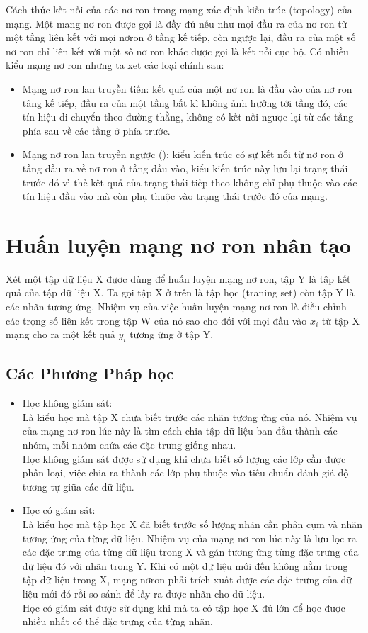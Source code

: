 \documentclass[13pt, a4paper]{extreport}
\begin{document}
\indent Cách thức kết nối của các nơ ron trong mạng xác định kiến trúc (topology) của mạng. Một mang nơ ron được gọi là đầy đủ nếu như mọi đầu ra của nơ ron từ một tầng liên kết với mọi nơron ở tầng kế tiếp, còn ngược lại, đầu ra của một số nơ ron chỉ liên kết với một sô nơ ron khác được gọi là kết nỗi cục bộ. Có nhiều kiểu mạng nơ ron nhưng ta xet các loại chính sau:
\begin{itemize}
\item Mạng nơ ron lan truyền tiến: kết quả của một nơ ron là đầu vào của nơ ron tâng kế tiếp, đầu ra của một tầng bất kì không ảnh hưởng tới tầng đó, các tín hiệu di chuyển theo đường thằng, không có kết nối ngược lại từ các tầng phía sau về các tầng ở phía trước.
\item Mạng nơ ron lan truyền ngược (): kiểu kiến trúc có sự kết nối từ nơ ron ở tầng đầu ra về nơ ron ở tầng đầu vào, kiểu kiến trúc này lưu lại trạng thái trước đó vì thế kêt quả của trạng thái tiếp theo không chỉ phụ thuộc vào các tín hiệu đầu vào mà còn phụ thuộc vào trạng thái trước đó của mạng.
\end{itemize}
\section{Huấn luyện mạng nơ ron nhân tạo}
Xét một tập dữ liệu X được dùng để huấn luyện mạng nơ ron, tập Y là tập kết quả của tập dữ liệu X. Ta gọi tập X ở trên là tập học (traning set) còn tập Y là các nhãn tương ứng. Nhiệm vụ của việc huấn luyện mạng nơ ron là điều chỉnh các trọng số liên kết trong tập W của nó sao cho đối với mọi đầu vào $x_i$ từ tập X mạng cho ra một kết quả $y_i$ tương ứng ở tập Y.
\subsection{Các Phương Pháp học}
\begin{itemize}
	\item Học không giám sát:\\
	\indent Là kiểu học mà tập X chưa biết trước các nhãn tương ứng của nó. Nhiệm vụ của mạng nơ ron lúc này là tìm cách chia tập dữ liệu ban đầu thành các nhóm, mỗi nhóm chứa các đặc trưng giống nhau.\\
	\indent Học không giám sát được sử dụng khi chưa biết số lượng các lớp cần được phân loại, việc chia ra thành các lớp phụ thuộc vào tiêu chuẩn đánh giá độ tương tự giữa các dữ liệu.
	\item Học có giám sát:\\
	\indent Là kiểu học mà tập học X đã biết trước số lượng nhãn cần phân cụm và nhãn tương ứng của từng dữ liệu. Nhiệm vụ của mạng nơ ron lúc này là lưu lọc ra các đặc trưng của từng dữ liệu trong X và gán tương ứng từng đặc trưng của dữ liệu đó với nhãn trong Y. Khi có một dữ liệu mới đến không nằm trong tập dữ liệu trong X, mạng nơron phải trích xuất được các đặc trưng của dữ liệu mới đó rồi so sánh để lấy ra được nhãn cho dữ liệu.\\
	\indent Học có giám sát được sử dụng khi mà ta có tập học X đủ lớn để học được nhiều nhất có thể đặc trưng của từng nhãn.
\end{itemize}
\end{document}
